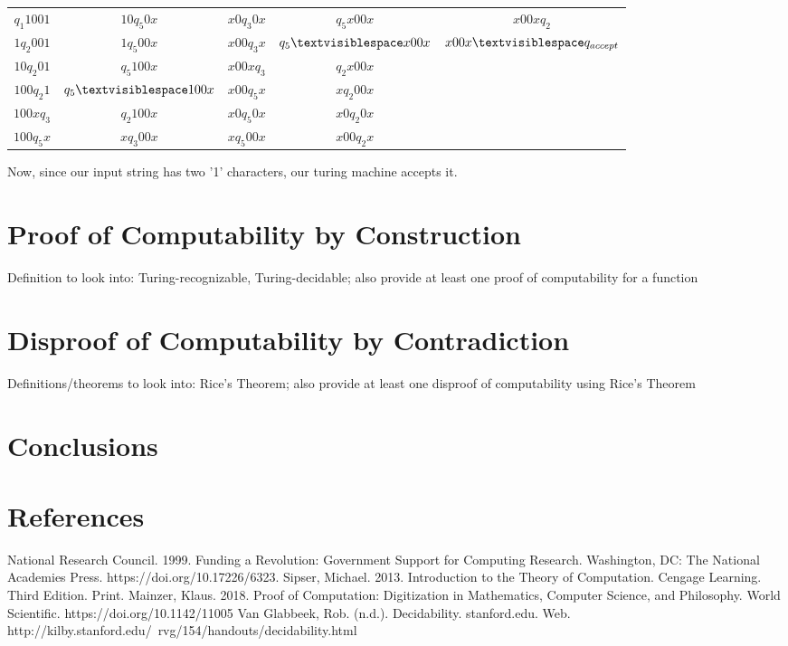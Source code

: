 \documentclass{article}
\begin{document}
\begin{exmp}
\begin{center}
\begin{tabular}{ c c c c c }
	$q_{1}1001$ & $10q_{5}0x$ & $x0q_{3}0x$ & $q_{5}x00x$ & $x00xq_{2}$ \\
	$1q_{2}001$ & $1q_{5}00x$ & $x00q_{3}x$ & $q_{5} \textvisiblespace x00x$ & $x00x \textvisiblespace q_{accept}$ \\
	$10q_{2}01$ & $q_{5}100x$ & $x00xq_{3}$ & $q_{2}x00x$\\
	$100q_{2}1$ & $q_{5} \textvisiblespace 100x$ & $x00q_{5}x$ & $xq_{2}00x$\\
	$100xq_{3}$ & $q_{2}100x$ & $x0q_{5}0x$ & $x0q_{2}0x$\\
	$100q_{5}x$ & $xq_{3}00x$ & $xq_{5}00x$ & $x00q_{2}x$
\end{tabular}
\end{center}
\end{exmp}
\noindent Now, since our input string has two '1' characters, our turing machine accepts it.
\section{Proof of Computability by Construction}
Definition to look into: Turing-recognizable, Turing-decidable; also provide at least one proof of computability for a function

\section{Disproof of Computability by Contradiction}
Definitions/theorems to look into: Rice's Theorem; also provide at least one disproof of computability using Rice's Theorem

\section{Conclusions}

\section{References}
\begin{thebibliography}{100}
	 National Research Council. 1999. Funding a Revolution: Government Support for Computing Research. Washington, DC: The National Academies Press. https://doi.org/10.17226/6323.
	 Sipser, Michael. 2013. Introduction to the Theory of Computation. Cengage Learning. Third Edition. Print.
	 Mainzer, Klaus. 2018. Proof of Computation: Digitization in Mathematics, Computer Science, and Philosophy. World Scientific. https://doi.org/10.1142/11005
	 Van Glabbeek, Rob. (n.d.). Decidability. stanford.edu. Web. http://kilby.stanford.edu/~rvg/154/handouts/decidability.html
\end{thebibliography}
\end{document}
